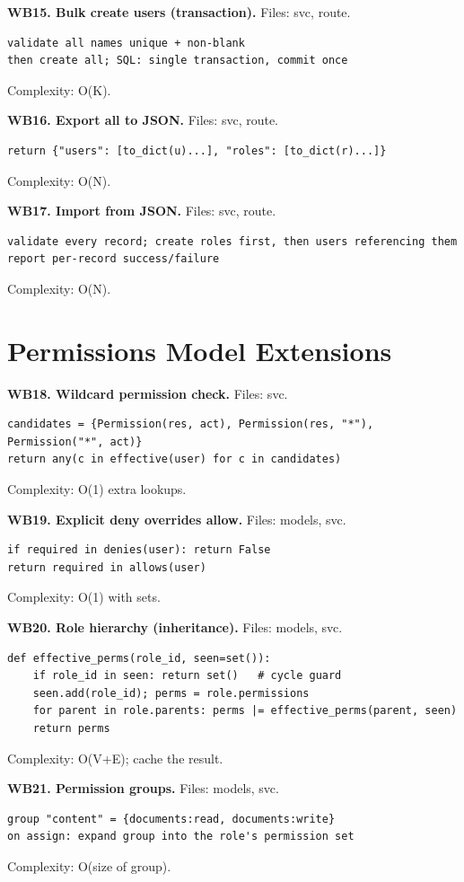 \documentclass[11pt,a4paper]{report}
\begin{document}
\textbf{WB15. Bulk create users (transaction).} Files: svc, route.
\begin{lstlisting}
validate all names unique + non-blank
then create all; SQL: single transaction, commit once
\end{lstlisting}
Complexity: O(K).

\textbf{WB16. Export all to JSON.} Files: svc, route.
\begin{lstlisting}
return {"users": [to_dict(u)...], "roles": [to_dict(r)...]}
\end{lstlisting}
Complexity: O(N).

\textbf{WB17. Import from JSON.} Files: svc, route.
\begin{lstlisting}
validate every record; create roles first, then users referencing them
report per-record success/failure
\end{lstlisting}
Complexity: O(N).

\section{Permissions Model Extensions}

\textbf{WB18. Wildcard permission check.} Files: svc.
\begin{lstlisting}
candidates = {Permission(res, act), Permission(res, "*"), Permission("*", act)}
return any(c in effective(user) for c in candidates)
\end{lstlisting}
Complexity: O(1) extra lookups.

\textbf{WB19. Explicit deny overrides allow.} Files: models, svc.
\begin{lstlisting}
if required in denies(user): return False
return required in allows(user)
\end{lstlisting}
Complexity: O(1) with sets.

\textbf{WB20. Role hierarchy (inheritance).} Files: models, svc.
\begin{lstlisting}
def effective_perms(role_id, seen=set()):
    if role_id in seen: return set()   # cycle guard
    seen.add(role_id); perms = role.permissions
    for parent in role.parents: perms |= effective_perms(parent, seen)
    return perms
\end{lstlisting}
Complexity: O(V+E); cache the result.

\textbf{WB21. Permission groups.} Files: models, svc.
\begin{lstlisting}
group "content" = {documents:read, documents:write}
on assign: expand group into the role's permission set
\end{lstlisting}
Complexity: O(size of group).
\end{document}
